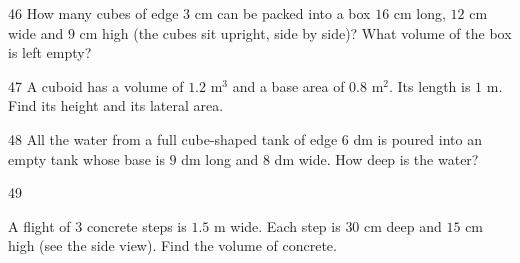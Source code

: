 \gap
\begin{probbox}{46}{}
How many cubes of edge $3$ cm can be packed into a box $16$ cm long, $12$ cm wide and $9$ cm high (the cubes sit upright, side by side)? What volume of the box is left empty?
\end{probbox}
\gap
\begin{probbox}{47}{}
A cuboid has a volume of $1.2$ m$^3$ and a base area of $0.8$ m$^2$. Its length is $1$ m. Find its height and its lateral area.
\end{probbox}
\gap
\begin{probbox}{48}{}
All the water from a full cube-shaped tank of edge $6$ dm is poured into an empty tank whose base is $9$ dm long and $8$ dm wide. How deep is the water?
\end{probbox}
\gap
\begin{probbox}{49}{}
\begin{minipage}[t]{0.6\linewidth}
A flight of $3$ concrete steps is $1.5$ m wide. Each step is $30$ cm deep and $15$ cm high (see the side view). Find the volume of concrete.
\end{minipage}\hfill
\begin{minipage}[t]{0.36\linewidth}\vspace{0pt}\centering
{}
\end{minipage}
\end{probbox}
